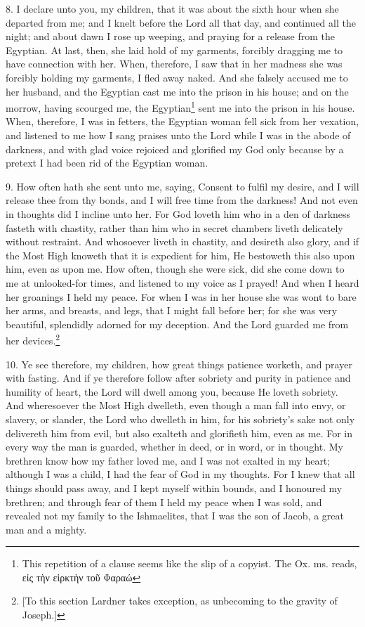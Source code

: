 8. I declare unto you, my children, that it was about the sixth hour when she departed from me; and I knelt before the Lord all that day, and continued all the night; and about dawn I rose up weeping, and praying for a release from the Egyptian. At last, then, she laid hold of my garments, forcibly dragging me to have connection with her. When, therefore, I saw that in her madness she was forcibly holding my garments, I fled away naked. And she falsely accused me to her husband, and the Egyptian cast me into the prison in his house; and on the morrow, having scourged me, the Egyptian\footnote{This repetition of a clause seems like the slip of a copyist. The Ox. ms. reads, \textgreek{εἰς τὴν εἱρκτὴν τοῦ Φαραώ}} sent me into the prison in his house. When, therefore, I was in fetters, the Egyptian woman fell sick from her vexation, and listened to me how I sang praises unto the Lord while I was in the abode of darkness, and with glad voice rejoiced and glorified my God only because by a pretext I had been rid of the Egyptian woman.

9. How often hath she sent unto me, saying, Consent to fulfil my desire, and I will release thee from thy bonds, and I will free time from the darkness! And not even in thoughts did I incline unto her. For God loveth him who in a den of darkness fasteth with chastity, rather than him who in secret chambers liveth delicately without restraint. And whosoever liveth in chastity, and desireth also glory, and if the Most High knoweth that it is expedient for him, He bestoweth this also upon him, even as upon me. How often, though she were sick, did she come down to me at unlooked-for times, and listened to my voice as I prayed! And when I heard her groanings I held my peace. For when I was in her house she was wont to bare her arms, and breasts, and legs, that I might fall before her; for she was very beautiful, splendidly adorned for my deception. And the Lord guarded me from her devices.\footnote{[To this section Lardner takes exception, as unbecoming to the gravity of Joseph.]}

10. Ye see therefore, my children, how great things patience worketh, and prayer with fasting. And if ye therefore follow after sobriety and purity in patience and humility of heart, the Lord will dwell among you, because He loveth sobriety. And wheresoever the Most High dwelleth, even though a man fall into envy, or slavery, or slander, the Lord who dwelleth in him, for his sobriety’s sake not only delivereth him from evil, but also exalteth and glorifieth him, even as me. For in every way the man is guarded, whether in deed, or in word, or in thought. My brethren know how my father loved me, and I was not exalted in my heart; although I was a child, I had the fear of God in my thoughts. For I knew that all things should pass away, and I kept myself within bounds, and I honoured my brethren; and through fear of them I held my peace when I was sold, and revealed not my family to the Ishmaelites, that I was the son of Jacob, a great man and a mighty.

